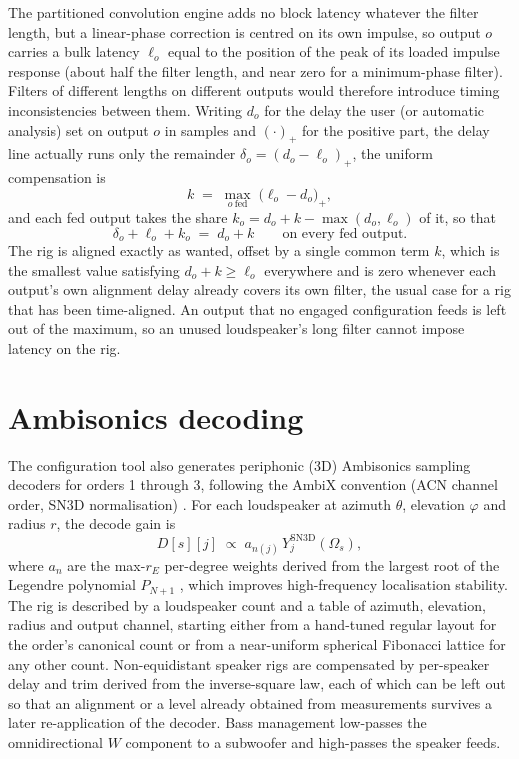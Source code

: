 \documentclass[10pt,a4paper]{article}
\begin{document}
The partitioned convolution engine adds no block latency whatever the filter length, but a linear-phase correction is centred on its own impulse, so output $o$ carries a bulk latency $\ell_o$ equal to the position of the peak of its loaded impulse response (about half the filter length, and near zero for a minimum-phase filter). Filters of different lengths on different outputs would therefore introduce timing inconsistencies between them. Writing $d_o$ for the delay the user (or automatic analysis) set on output $o$ in samples and $(\cdot)_+$ for the positive part, the delay line actually runs only the remainder $\delta_o = (d_o-\ell_o)_+$, the uniform compensation is
\begin{equation}
  k \;=\; \max_{o\ \mathrm{fed}}\;\bigl(\ell_o - d_o\bigr)_+ ,
\end{equation}
and each fed output takes the share $k_o = d_o + k - \max(d_o,\ell_o)$ of it, so that
\begin{equation}
  \delta_o + \ell_o + k_o \;=\; d_o + k
  \qquad \text{on every fed output.}
\end{equation}
The rig is aligned exactly as wanted, offset by a single common term $k$, which is the smallest value satisfying $d_o + k \ge \ell_o$ everywhere and is zero whenever each output's own alignment delay already covers its own filter, the usual case for a rig that has been time-aligned. An output that no engaged configuration feeds is left out of the maximum, so an unused loudspeaker's long filter cannot impose latency on the rig.

\section{Ambisonics decoding}\label{sec:ambi}

The configuration tool also generates periphonic (3D) Ambisonics sampling decoders for orders 1 through 3, following the AmbiX convention (ACN channel order, SN3D normalisation) \cite{NachbarAmbiX2011}. For each loudspeaker at azimuth $\theta$, elevation $\varphi$ and radius $r$, the decode gain is
\begin{equation}
  D[s][j] \;\propto\; a_{n(j)}\,Y_j^{\mathrm{SN3D}}(\Omega_s),
\end{equation}
where $a_n$ are the max-$r_E$ per-degree weights derived from the largest root of the Legendre polynomial $P_{N+1}$ \cite{ZotterFrank2019}, which improves high-frequency localisation stability. The rig is described by a loudspeaker count and a table of azimuth, elevation, radius and output channel, starting either from a hand-tuned regular layout for the order's canonical count or from a near-uniform spherical Fibonacci lattice for any other count. Non-equidistant speaker rigs are compensated by per-speaker delay and trim derived from the inverse-square law, each of which can be left out so that an alignment or a level already obtained from measurements survives a later re-application of the decoder. Bass management low-passes the omnidirectional $W$ component to a subwoofer and high-passes the speaker feeds.
\end{document}
